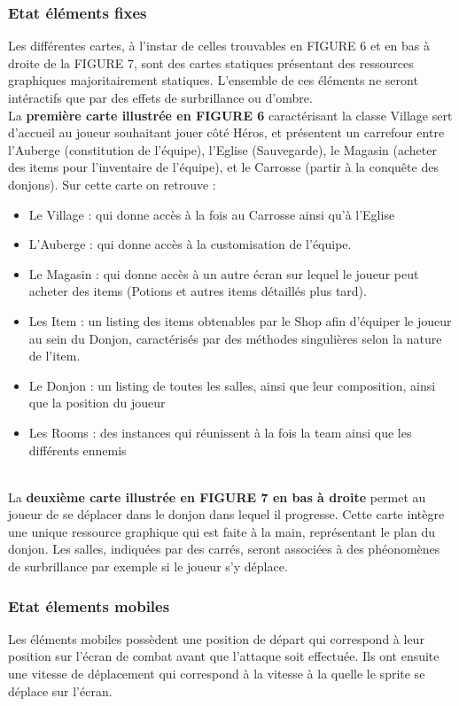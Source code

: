 \documentclass[a4paper,12pt]{article}
\begin{document}
\subsubsection{Etat éléments fixes}
Les différentes cartes, à l'instar de celles trouvables en FIGURE 6 et en bas à droite de la FIGURE 7, sont des cartes statiques présentant des ressources graphiques majoritairement statiques. L'ensemble de ces éléments ne seront intéractifs que par des effets de surbrillance ou d'ombre. 
\\ \indent
La \textbf{première carte illustrée en FIGURE 6} caractérisant la classe Village sert d'accueil au joueur souhaitant jouer côté Héros, et présentent un carrefour entre l'Auberge (constitution de l'équipe), l'Eglise (Sauvegarde), le Magasin (acheter des items pour l'inventaire de l'équipe), et le Carrosse (partir à la conquête des donjons). Sur cette carte on retrouve : 
\begin{itemize}
    \item Le Village : qui donne accès à la fois au Carrosse ainsi qu'à l'Eglise
    \item L'Auberge : qui donne accès à la customisation de l'équipe.
    \item Le Magasin : qui donne accès à un autre écran sur lequel le joueur peut acheter des items (Potions et autres items détaillés plus tard).
    \item Les Item : un listing des items obtenables par le Shop afin d'équiper le joueur au sein du Donjon, caractérisés par des méthodes singulières selon la nature de l'item.
    \item Le Donjon : un listing de toutes les salles, ainsi que leur composition, ainsi que la position du joueur
    \item Les Rooms : des instances qui réunissent à la fois la team ainsi que les différents ennemis
\end{itemize}
\\ \indent
La \textbf{deuxième carte illustrée en FIGURE 7 en bas à droite} permet au joueur de se déplacer dans le donjon dans lequel il progresse. Cette carte intègre une unique ressource graphique qui est faite à la main, représentant le plan du donjon. Les salles, indiquées par des carrés, seront associées à des phéonomènes de surbrillance par exemple si le joueur s'y déplace.



\subsubsection{Etat élements mobiles}
Les éléments mobiles possèdent une position de départ qui correspond à leur position sur l'écran de combat avant que l'attaque soit effectuée. Ils ont ensuite une vitesse de déplacement qui correspond à la vitesse à la quelle le sprite se déplace sur l'écran. 
\end{document}
